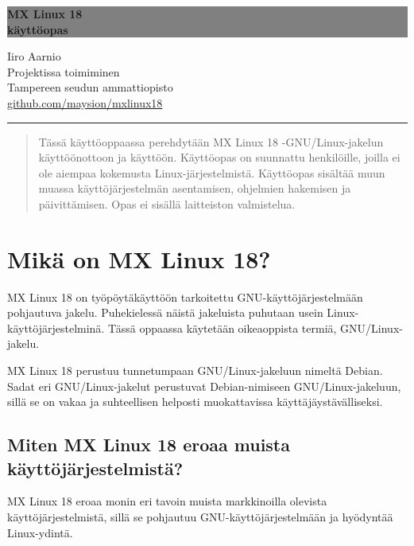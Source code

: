\documentclass[a4paper, 12pt, finnish]{article}
\begin{document}
\begin{titlepage}
	\colorbox{grey}{
		\parbox[t]{0.93\textwidth}{
			\parbox[t]{0.91\textwidth}{
				\raggedleft
				\fontsize{80pt}{80pt}\selectfont
				\vspace{0.7cm}
				\textbf{MX Linux 18\\
				käyttöopas\\}
				\vspace{0.7cm}
			}
		}
	}
	\vfill
	\parbox[t]{0.93\textwidth}{
		\raggedleft
		\large
		{\Large Iiro Aarnio}\\[4pt]
		Projektissa toimiminen\\
		Tampereen seudun ammattiopisto\\[4pt]
		\url{github.com/maysion/mxlinux18}\\
		\hfill\rule{0.2\linewidth}{1pt}
	}
\end{titlepage}
\thispagestyle{empty}
\begin{abstract}
	Tässä käyttöoppaassa perehdytään MX Linux 18 -GNU/Linux-jakelun käyttöönottoon ja käyttöön. Käyttöopas on suunnattu henkilöille, joilla ei ole aiempaa kokemusta Linux-järjestelmistä. Käyttöopas sisältää muun muassa käyttöjärjestelmän asentamisen, ohjelmien hakemisen ja päivittämisen. Opas ei sisällä laitteiston valmistelua.
\end{abstract}

\newpage
\thispagestyle{empty}
\tableofcontents
\newpage
{}
\setcounter{page}{1}
\newpage


\section{Mikä on MX Linux 18?}
MX Linux 18 on työpöytäkäyttöön tarkoitettu GNU-käyttöjärjestelmään pohjautuva jakelu. Puhekielessä näistä jakeluista puhutaan usein Linux-käyttöjärjestelminä. Tässä oppaassa käytetään oikeaoppista termiä, GNU/Linux-jakelu.

MX Linux 18 perustuu tunnetumpaan GNU/Linux-jakeluun nimeltä Debian. Sadat eri GNU/Linux-jakelut perustuvat Debian-nimiseen GNU/Linux-jakeluun, sillä se on vakaa ja suhteellisen helposti muokattavissa käyttäjäystävälliseksi.

\subsection{Miten MX Linux 18 eroaa muista käyttöjärjestelmistä?}
MX Linux 18 eroaa monin eri tavoin muista markkinoilla olevista käyttöjärjestelmistä, sillä se pohjautuu GNU-käyttöjärjestelmään ja hyödyntää Linux-ydintä.
\end{document}
